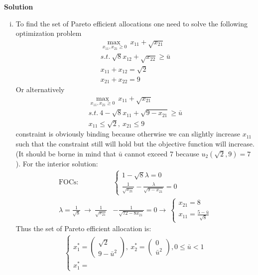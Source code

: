 \documentclass[a4paper]{article}
\begin{document}
\textbf{Solution}
\begin{enumerate}[(i)]
	\item To find the set of Pareto efficient allocations one need to solve the following optimization problem
	\begin{align*}
	\underset{x_{11}, x_{21} \ge 0}{\max\ }\ x_{11} + \sqrt{x_{21}}\\
	s.t.\ \sqrt{8}x_{12} + \sqrt{x_{22}} \ge \bar{u}\\
	x_{11} + x_{12} = \sqrt{2}\\
	x_{21} + x_{22} = 9
	\end{align*}
	Or alternatively
	\begin{align*}
	\underset{x_{11}, x_{21} \ge 0}{\max}\ x_{11} + \sqrt{x_{21}}\\
	s.t.\ 4 - \sqrt{8}x_{11} + \sqrt{9 - x_{21}} \ge \bar{u}\\
	x_{11} \le \sqrt{2},\ x_{21} \le 9
	\end{align*}
	constraint is obviously binding because otherwise we can slightly increase $x_{11}$ such that the constraint still will hold but the objective function will increase.
	(It should be borne in mind that $\bar{u}$ cannot exceed 7 because $u_2(\sqrt{2}, 9) = 7$). For the interior solution:
	\begin{align*}
	\text{FOCs}: &\begin{cases}
	1 - \sqrt{8}\lambda = 0\\
	\frac{1}{\sqrt{x_{21}}} - \frac{\lambda}{\sqrt{9 - x_{21}}} = 0
	\end{cases}\\
	\lambda = \frac{1}{\sqrt{8}}\ \to\ 
	\frac{1}{\sqrt{x_{21}}} &- \frac{1}{\sqrt{72 - 8 x_{21}}} = 0 \to\ \begin{cases} x_{21} = 8\\
	x_{11} = \frac{5 - \bar{u}}{\sqrt{8}}
	\end{cases}
	\end{align*}
	Thus the set of Pareto efficient allocation is:
	\begin{align}\label{eq1}
	\begin{cases}
	x^*_1 = 
	\begin{pmatrix}
	\sqrt{2}\\
	9 - \bar{u}^2
	\end{pmatrix},\ x^*_2 = \begin{pmatrix}
	0\\
	\bar{u}^2
	\end{pmatrix}, 0 \le \bar{u} < 1\\
	x^*_1 = 

\end{cases}
\end{align}
\end{enumerate}
\end{document}
